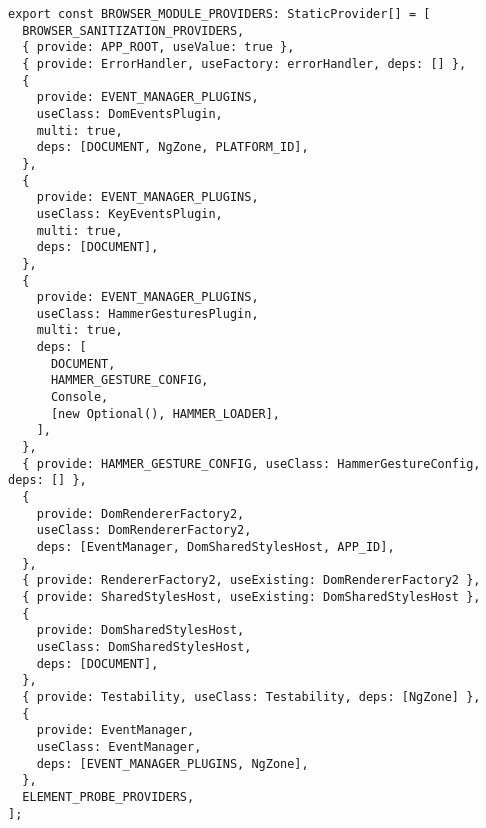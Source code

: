 \begin{verbatim}
export const BROWSER_MODULE_PROVIDERS: StaticProvider[] = [
  BROWSER_SANITIZATION_PROVIDERS,
  { provide: APP_ROOT, useValue: true },
  { provide: ErrorHandler, useFactory: errorHandler, deps: [] },
  {
    provide: EVENT_MANAGER_PLUGINS,
    useClass: DomEventsPlugin,
    multi: true,
    deps: [DOCUMENT, NgZone, PLATFORM_ID],
  },
  {
    provide: EVENT_MANAGER_PLUGINS,
    useClass: KeyEventsPlugin,
    multi: true,
    deps: [DOCUMENT],
  },
  {
    provide: EVENT_MANAGER_PLUGINS,
    useClass: HammerGesturesPlugin,
    multi: true,
    deps: [
      DOCUMENT,
      HAMMER_GESTURE_CONFIG,
      Console,
      [new Optional(), HAMMER_LOADER],
    ],
  },
  { provide: HAMMER_GESTURE_CONFIG, useClass: HammerGestureConfig, deps: [] },
  {
    provide: DomRendererFactory2,
    useClass: DomRendererFactory2,
    deps: [EventManager, DomSharedStylesHost, APP_ID],
  },
  { provide: RendererFactory2, useExisting: DomRendererFactory2 },
  { provide: SharedStylesHost, useExisting: DomSharedStylesHost },
  {
    provide: DomSharedStylesHost,
    useClass: DomSharedStylesHost,
    deps: [DOCUMENT],
  },
  { provide: Testability, useClass: Testability, deps: [NgZone] },
  {
    provide: EventManager,
    useClass: EventManager,
    deps: [EVENT_MANAGER_PLUGINS, NgZone],
  },
  ELEMENT_PROBE_PROVIDERS,
];
\end{verbatim}
